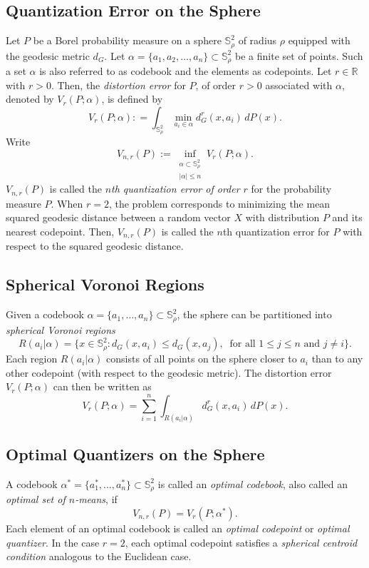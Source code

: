 \documentclass[12pt, reqno]{amsart}
\theoremstyle{plain}
\theoremstyle{definition}
\newcommand{\ga}{\alpha}
\newcommand{\tit}{\textit}%
\newcommand{\D}[1]{\mathbb{#1}}%
\newcommand{\te}{\text}%
\begin{document}
\subsection{Quantization Error on the Sphere}
Let $P$ be a Borel probability measure on a sphere $\D S_\rho^2$ of radius $\rho$ equipped with the geodesic metric $d_G$. 
Let \( \alpha = \{ a_1, a_2, \dots, a_n \} \subset \D S_\rho^2 \) be a finite set of points.  Such a set $\ga$ is also referred to as codebook and the elements as codepoints. Let $r \in\D R$ with $r>0$. 
Then, the \emph{distortion error} for $P$, of order \( r > 0 \) associated with \( \alpha \), denoted by $V_r(P; \ga)$, is defined by
\[
V_{r}(P; \alpha): = \int_{\D S_\rho^2} \min_{a_i \in \alpha} d^r_G(x, a_i) \, dP(x). 
\]
 Write
\[
V_{n, r}(P):= \inf_{\substack{\alpha \subset \D S_\rho^2 \\ |\alpha| \le n}} V_{r}(P; \alpha).
\]
$V_{n, r}(P)$ is called the \tit{$n$th quantization error of order $r$} for the probability measure $P$. 
When \( r = 2 \), the problem corresponds to minimizing the mean squared geodesic distance between a random vector $X$ with distribution $P$ and its nearest codepoint. Then, $V_{n, r}(P)$ is  called the $n$th quantization error for $P$ with respect to the squared geodesic distance.  

\subsection{Spherical Voronoi Regions}

Given a codebook \( \alpha = \{ a_1, \dots, a_n \} \subset \D S_\rho^2 \), the sphere can be partitioned into \emph{spherical Voronoi regions}
\[
R(a_i|\ga)= \{ x \in \D S_\rho^2 : d_G(x, a_i) \le d_G(x, a_j), \ \te{ for all } 1\leq j \leq n \te{ and } j \neq i  \}.
\]
Each region \( R(a_i|\ga)\) consists of all points on the sphere closer to \( a_i \) than to any other codepoint (with respect to the geodesic metric).
The distortion error $V_{r}(P; \ga)$ can then be written as
\[
V_{r}(P; \alpha) = \sum_{i=1}^{n} \int_{R(a_i|\ga)} d^r_G(x, a_i) \, dP(x).
\]
 
\subsection{Optimal Quantizers on the Sphere}

A codebook \( \alpha^* = \{ a_1^*, \dots, a_n^* \} \subset \D S_\rho^2 \) is called an \tit{optimal codebook}, also called an \tit{optimal set of $n$-means}, if
\[
V_{n, r}(P) = V_{r}(P; \alpha^*).
\]
Each element of an optimal codebook is called an \tit{optimal codepoint} or \tit{optimal quantizer}. 
In the case \( r = 2 \), each optimal codepoint satisfies a \emph{spherical centroid condition} analogous to the Euclidean case.
\end{document}
